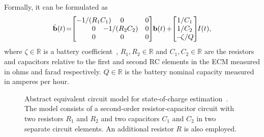 \documentclass[letterpaper,10pt,conference,twoside]{IEEEtran}
\theoremstyle{definition}
\begin{document}
Formally, it can be formulated as~\cite{zhao2017observability}
\begin{equation}\label{eq:battmodel}
  \dot{\mathbf{b}}(t)\hspace*{-.4ex}=\hspace*{-.7ex}\begin{bmatrix}-1/(R_1C_1)\hspace*{-2ex}&\hspace*{-2ex}0&0\\\hspace*{2ex}0&\hspace*{-3ex}-1/(R_2C_2)&0\\\hspace*{2ex}0&\hspace*{-2ex}0&0\end{bmatrix}\hspace*{-.6ex}\mathbf{b}(t)\hspace*{-.2ex}+\hspace*{-.6ex}\begin{bmatrix}\hspace*{-.2ex}1/C_1\\\hspace*{-.2ex}1/C_2\\-\hspace*{-.4ex}\zeta/Q\end{bmatrix}\hspace*{-.7ex}I(t),
\end{equation}
where $\zeta\in\mathbb{R}$ is a battery coefficient~\cite{seewald2022energy}, $R_1,R_2\in\mathbb{R}$ and $C_1,C_2\in\mathbb{R}$ are the resistors and capacitors relative to the first and second RC elements in the ECM measured in ohms and farad respectively.
$Q\in\mathbb{R}$ is the battery nominal capacity measured in amperes per hour.


\begin{figure}[t!]
  \vspace*{-.2cm}
  \begin{minipage}[c]{.43\columnwidth}
    \vspace*{.24cm}
    \caption{Abstract equivalent circuit model for state-of-charge estimation~\cite{seewaldphdthesis}. The model consists of a second-order resistor-capacitor circuit with two resistors $R_1$ and $R_2$ and two capacitors $C_1$ and $C_2$ in two separate circuit elements. An additional resistor $R$ is also employed. %
    } 
    \label{fig:thevenin}
  \end{minipage}
  \begin{minipage}[c]{.57\columnwidth}
    \centering
    \vspace*{-.1cm}
    
  \end{minipage}
  \vspace*{-.6cm}
\end{figure}
\end{document}
